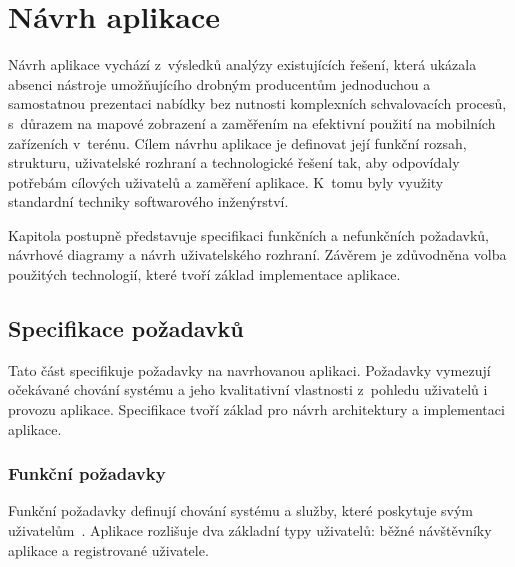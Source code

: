 \chapter{Návrh aplikace}
Návrh aplikace vychází z~výsledků analýzy existujících řešení, která ukázala absenci nástroje umožňujícího drobným producentům jednoduchou a samostatnou prezentaci nabídky bez nutnosti komplexních schvalovacích procesů, s~důrazem na mapové zobrazení a zaměřením na efektivní použití na mobilních zařízeních v~terénu.
Cílem návrhu aplikace je definovat její funkční rozsah, strukturu, uživatelské rozhraní a technologické řešení tak, aby odpovídaly potřebám cílových uživatelů a zaměření aplikace.
K~tomu byly využity standardní techniky softwarového inženýrství.

Kapitola postupně představuje specifikaci funkčních a nefunkčních požadavků, návrhové diagramy a návrh uživatelského rozhraní.
Závěrem je zdůvodněna volba použitých technologií, které tvoří základ implementace aplikace.


\section{Specifikace požadavků}

Tato část specifikuje požadavky na navrhovanou aplikaci.
Požadavky vymezují očekávané chování systému a jeho kvalitativní vlastnosti z~pohledu uživatelů i provozu aplikace.
Specifikace tvoří základ pro návrh architektury a implementaci aplikace.

\subsection{Funkční požadavky}

Funkční požadavky definují chování systému a služby, které poskytuje svým uživatelům~\parencite{somerville_se}.
Aplikace rozlišuje dva základní typy uživatelů: běžné návštěvníky aplikace a registrované uživatele.

